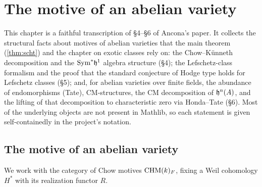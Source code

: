 \chapter{The motive of an abelian variety}

This chapter is a faithful transcription of \S4--\S6 of Ancona's paper. It
collects the structural facts about motives of abelian varieties that the main
theorem (\cref{thm:scht}) and the chapter on exotic classes rely on: the
Chow--K\"unneth decomposition and the \(\mathrm{Sym}^*\mathfrak{h}^1\) algebra structure
(\S4); the Lefschetz-class formalism and the proof that the standard conjecture
of Hodge type holds for Lefschetz classes (\S5); and, for abelian varieties over
finite fields, the abundance of endomorphisms (Tate), CM-structures, the CM
decomposition of \(\mathfrak{h}^n(A)\), and the lifting of that decomposition to
characteristic zero via Honda--Tate (\S6). Most of the underlying objects are
not present in Mathlib, so each statement is given self-containedly in the
project's notation.

\providecommand{\Frob}{\mathrm{Frob}}
\providecommand{\GSp}{\mathrm{GSp}}

\section*{The motive of an abelian variety}

We work with the category of Chow motives \(\mathrm{CHM}(k)_{F}\), fixing a Weil
cohomology \(H^*\) with its realization functor \(R\).

